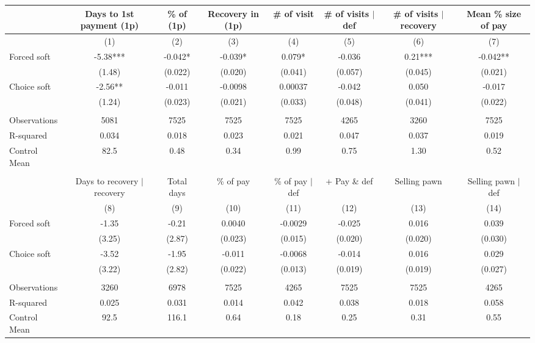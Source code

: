\begin{tabular}{lccccccc}
\toprule
      & Days to 1st payment (1p) & \% of (1p) & Recovery in (1p) & \# of visit & \# of visits $|$ def & \# of visits $|$ recovery & Mean \% size of pay \\
\midrule
\midrule
      & (1)   & (2)   & (3)   & (4)   & (5)   & (6)   & (7) \\
\midrule
\midrule
Forced soft & -5.38*** & -0.042* & -0.039* & 0.079* & -0.036 & 0.21*** & -0.042** \\
      & (1.48) & (0.022) & (0.020) & (0.041) & (0.057) & (0.045) & (0.021) \\
Choice soft & -2.56** & -0.011 & -0.0098 & 0.00037 & -0.042 & 0.050 & -0.017 \\
      & (1.24) & (0.023) & (0.021) & (0.033) & (0.048) & (0.041) & (0.022) \\
      &       &       &       &       &       &       &  \\
\midrule
Observations & 5081  & 7525  & 7525  & 7525  & 4265  & 3260  & 7525 \\
R-squared & 0.034 & 0.018 & 0.023 & 0.021 & 0.047 & 0.037 & 0.019 \\
Control Mean & 82.5  & 0.48  & 0.34  & 0.99  & 0.75  & 1.30  & 0.52 \\
\midrule
\midrule
      &       &       &       &       &       &       &  \\
\midrule
      & Days to recovery $|$ recovery & Total days & \% of pay & \% of pay $|$ def  & + Pay \& def & Selling pawn & Selling pawn $|$ def \\
\midrule
\midrule
      & (8)   & (9)   & (10)  & (11)  & (12)  & (13)  & (14) \\
\midrule
\midrule
Forced soft & -1.35 & -0.21 & 0.0040 & -0.0029 & -0.025 & 0.016 & 0.039 \\
      & (3.25) & (2.87) & (0.023) & (0.015) & (0.020) & (0.020) & (0.030) \\
Choice soft & -3.52 & -1.95 & -0.011 & -0.0068 & -0.014 & 0.016 & 0.029 \\
      & (3.22) & (2.82) & (0.022) & (0.013) & (0.019) & (0.019) & (0.027) \\
      &       &       &       &       &       &       &  \\
\midrule
Observations & 3260  & 6978  & 7525  & 4265  & 7525  & 7525  & 4265 \\
R-squared & 0.025 & 0.031 & 0.014 & 0.042 & 0.038 & 0.018 & 0.058 \\
Control Mean & 92.5  & 116.1 & 0.64  & 0.18  & 0.25  & 0.31  & 0.55 \\
\bottomrule
\bottomrule
\end{tabular}%
